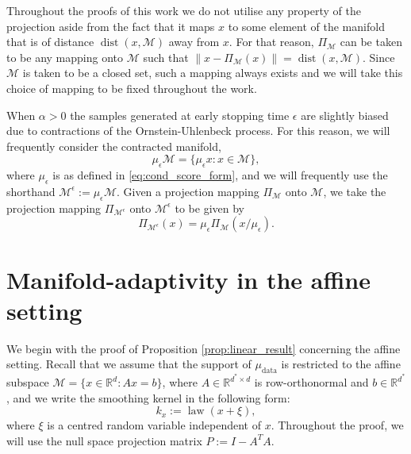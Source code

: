 \documentclass[10pt]{article}
\theoremstyle{plain}
\theoremstyle{definition}
\theoremstyle{remark}
\newcommand{\M}{{\mathcal{M}}}
\newcommand{\R}{\mathbb{R}}
\newcommand{\mud}{\mu_{\operatorname{data}}}
\newcommand{\dist}{\operatorname{dist}}
\newcommand{\law}{\operatorname{law}}
\begin{document}
Throughout the proofs of this work we do not utilise any property of the projection aside from the fact that it maps \(x\) to some element of the manifold that is of distance \(\dist(x, \M)\) away from \(x\). For that reason, \(\Pi_\M\) can be taken to be any mapping onto \(\M\) such that \(\|x - \Pi_\M(x)\| = \dist(x, \M)\). Since \(\M\) is taken to be a closed set, such a mapping always exists and we will take this choice of mapping to be fixed throughout the work.

When \(\alpha > 0\) the samples generated at early stopping time \(\epsilon\) are slightly biased due to contractions of the Ornstein-Uhlenbeck process. For this reason, we will frequently consider the contracted manifold,
\begin{equation*}
    \mu_\epsilon \M = \{\mu_\epsilon x: x \in \M\},
\end{equation*}
where \(\mu_\epsilon\) is as defined in \eqref{eq:cond_score_form}, and we will frequently use the shorthand \(\M^\epsilon := \mu_\epsilon \M\). Given a projection mapping \(\Pi_\M\) onto \(\M\), we take the projection mapping \(\Pi_{\M^\epsilon}\) onto \(\M^\epsilon\) to be given by
\begin{equation*}
    \Pi_{\M^\epsilon}(x) = \mu_\epsilon \Pi_\M(x/\mu_\epsilon).
\end{equation*}

\section{Manifold-adaptivity in the affine setting}\label{app:linear}
We begin with the proof of Proposition \ref{prop:linear_result} concerning the affine setting. Recall that we assume that the support of \(\mud\) is restricted to the affine subspace \(\M = \{x \in \R^d: Ax = b\}\), where \(A \in \R^{d^* \times d}\) is row-orthonormal and \(b \in \R^{d^*}\), and we write the smoothing kernel in the following form:
\begin{equation*}
    k_x := \law(x + \xi),
\end{equation*}
where \(\xi\) is a centred random variable independent of \(x\). Throughout the proof, we will use the null space projection matrix \(P := I-A^TA\).
\end{document}
